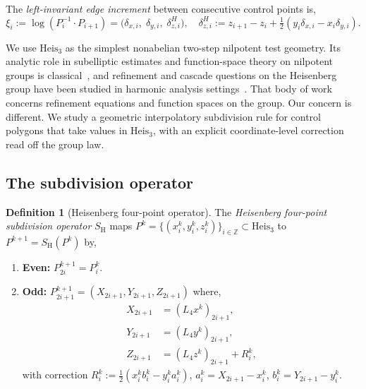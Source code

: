 \documentclass{article}
\theoremstyle{plain}
\theoremstyle{definition}
\newtheorem{definition}[theorem]{Definition}
\newcommand{\Z}{\mathbb{Z}}
\newcommand{\Heis}{\mathrm{Heis}_3}
\newcommand{\SH}{S_{\mathrm{H}}}
\newcommand{\Lop}{L_4}
\begin{document}
The \emph{left-invariant edge increment} between consecutive control points is,
\begin{equation}\label{eq:increment}
  \xi_i := \log(P_i^{-1}\cdot P_{i+1})
    = \bigl(\delta_{x,i},\;\delta_{y,i},\;\delta_{z,i}^H\bigr), \quad
  \delta_{z,i}^H := z_{i+1}-z_i + \tfrac{1}{2}(y_i\delta_{x,i}-x_i\delta_{y,i}).
\end{equation}

We use $\Heis$ as the simplest nonabelian two-step nilpotent test geometry. Its
analytic role in subelliptic estimates and function-space theory on nilpotent
groups is classical~\cite{Folland75}, and refinement and cascade questions on
the Heisenberg group have been studied in harmonic analysis
settings~\cite{LiuLiu06, LiuLiu07}. That body of work concerns refinement
equations and function spaces on the group. Our concern is different. We study a
geometric interpolatory subdivision rule for control polygons that take values
in $\Heis$, with an explicit coordinate-level correction read off the group law.

\subsection{The subdivision operator}

\begin{definition}[Heisenberg four-point operator]\label{def:scheme}
The \emph{Heisenberg four-point subdivision operator} $\SH$ maps
$P^k=\{(x_i^k,y_i^k,z_i^k)\}_{i\in\Z}\subset\Heis$ to
$P^{k+1}=\SH(P^k)$ by,
\begin{enumerate}[label=(\roman*)]
  \item \textbf{Even:} $P_{2i}^{k+1}=P_i^k$.
  \item \textbf{Odd:} $P_{2i+1}^{k+1}=(X_{2i+1},Y_{2i+1},Z_{2i+1})$ where,
    \begin{align}
      X_{2i+1}&=(\Lop x^k)_{2i+1}, \label{eq:Xins}\\
      Y_{2i+1}&=(\Lop y^k)_{2i+1}, \label{eq:Yins}\\
      Z_{2i+1}&=(\Lop z^k)_{2i+1}+R_i^k, \label{eq:Zins}
    \end{align}
    with correction $R_i^k:=\tfrac{1}{2}(x_i^k b_i^k - y_i^k a_i^k)$,
    $a_i^k=X_{2i+1}-x_i^k$, $b_i^k=Y_{2i+1}-y_i^k$.
\end{enumerate}
\end{definition}
\end{document}
